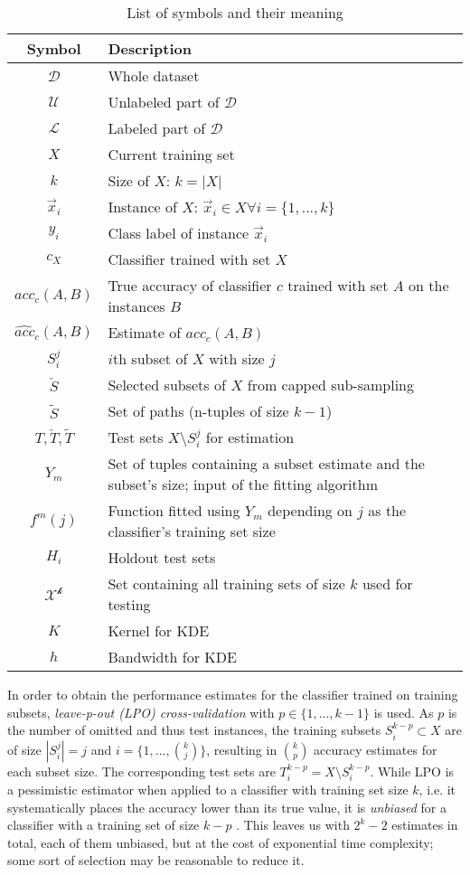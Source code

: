 \begin{table}[h]
\centering
\begin{tabular}{c | C{8cm}}
Symbol & Description\\
\hline
$\mathcal{D}$ & Whole dataset\\
$\mathcal{U}$ & Unlabeled part of $\mathcal{D}$\\
$\mathcal{L}$ & Labeled part of $\mathcal{D}$\\
$X$ & Current training set\\
$k$ & Size of $X$: $k = |X|$\\
$\vec{x}_i$ & Instance of $X$: $\vec{x}_i \in X \forall i=\{1,...,k\}$\\
$y_i$ & Class label of instance $\vec{x}_i$\\
$c_X$ & Classifier trained with set $X$\\
$acc_c(A,B)$ & True accuracy of classifier $c$ trained with set $A$ on the instances $B$\\
$\widehat{acc}_c(A,B)$ & Estimate of $acc_c(A,B)$\\
$S^j_i$ & $i$th subset of $X$ with size $j$\\
$\check{S}$ & Selected subsets of $X$ from capped sub-sampling\\
$\tilde{S}$ & Set of paths (n-tuples of size $k-1$)\\
$T, \check{T}, \tilde{T}$ & Test sets $X \setminus S^j_i$ for estimation\\
$Y_m$ & Set of tuples containing a subset estimate and the subset's size; input of the fitting algorithm\\
$f^m(j)$ & Function fitted using $Y_m$ depending on $j$ as the classifier's training set size\\
$H_i$ & Holdout test sets\\
$\mathcal{X^k}$ & Set containing all training sets of size $k$ used for testing\\
$K$ & Kernel for KDE\\
$h$ & Bandwidth for KDE\\
\end{tabular}
\caption{List of symbols and their meaning}
\label{tab:tos}
\end{table}

In order to obtain the performance estimates for the classifier trained on training subsets, \textit{leave-p-out (LPO) cross-validation} with $p \in \{1,...,k-1\}$ is used. As $p$ is the number of omitted and thus test instances, the training subsets $S^{k-p}_i \subset X$ are of size $|S^j_i| = j$ and $i = \{1,...,{k \choose j}\}$, resulting in ${k \choose p}$ accuracy estimates for each subset size. The corresponding test sets are $T^{k-p}_i = X \setminus S^{k-p}_i$. While LPO is a pessimistic estimator when applied to a classifier with training set size $k$, i.e. it systematically places the accuracy lower than its true value, it is \textit{unbiased} for a classifier with a training set of size $k-p$ \cite{RodriguezEtAl2013}. This leaves us with $2^k-2$ estimates in total, each of them unbiased, but at the cost of exponential time complexity; some sort of selection may be reasonable to reduce it.

